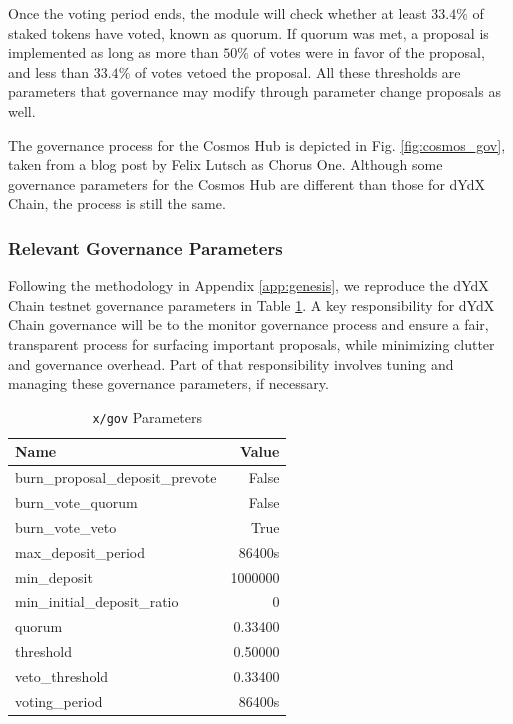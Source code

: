         Once the voting period ends, the module will check whether at least $33.4\%$ of staked tokens have voted, known as quorum. If quorum was met, a proposal is implemented as long as more than $50\%$ of votes were in favor of the proposal, and less than $33.4\%$ of votes vetoed the proposal. All these thresholds are parameters that governance may modify through parameter change proposals as well.

        The governance process for the Cosmos Hub is depicted in Fig. \ref{fig:cosmos_gov}, taken from a blog post by Felix Lutsch as Chorus One. Although some governance parameters for the Cosmos Hub are different than those for dYdX Chain, the process is still the same.

        \subsubsection{Relevant Governance Parameters}

            Following the methodology in Appendix \ref{app:genesis}, we reproduce the dYdX Chain testnet governance parameters in Table \ref{tab:x_gov_params}. A key responsibility for dYdX Chain governance will be to the monitor governance process and ensure a fair, transparent process for surfacing important proposals, while minimizing clutter and governance overhead. Part of that responsibility involves tuning and managing these governance parameters, if necessary.

            \begin{table}[htp]
                \centering
                \captionsetup{justification=centering}
                \caption{\texttt{x/gov} Parameters}
                \begin{tabular}{lr}
                    \toprule
                    Name & Value \\
                    \midrule
                    burn\_proposal\_deposit\_prevote & False \\
                    burn\_vote\_quorum & False \\
                    burn\_vote\_veto & True \\
                    max\_deposit\_period & 86400s \\
                    min\_deposit & 1000000 \\
                    min\_initial\_deposit\_ratio & 0 \\
                    quorum & 0.33400 \\
                    threshold & 0.50000 \\
                    veto\_threshold & 0.33400 \\
                    voting\_period & 86400s \\
                    \bottomrule
                \end{tabular}
                \label{tab:x_gov_params}
            \end{table}
        
